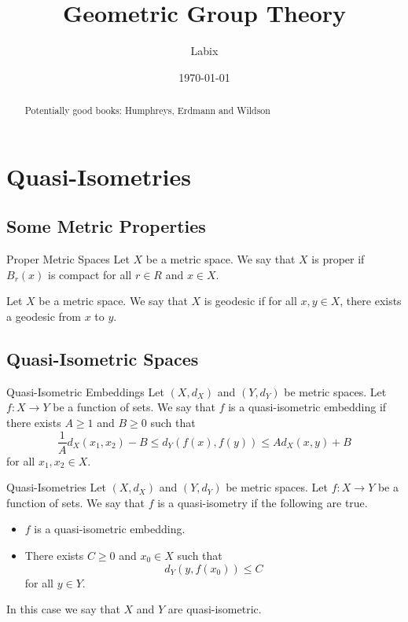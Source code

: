 \documentclass[a4paper]{article}
\title{Geometric Group Theory}
\author{Labix}
\date{\today}
\begin{document}
\maketitle
\begin{abstract}
Potentially good books: Humphreys, Erdmann and Wildson
\end{abstract}
\pagebreak
\tableofcontents

\pagebreak
\section{Quasi-Isometries}
\subsection{Some Metric Properties}
\begin{defn}{Proper Metric Spaces}{} Let $X$ be a metric space. We say that $X$ is proper if $B_r(x)$ is compact for all $r\in R$ and $x\in X$. 
\end{defn}

\begin{defn}{}{} Let $X$ be a metric space. We say that $X$ is geodesic if for all $x,y\in X$, there exists a geodesic from $x$ to $y$. 
\end{defn}

\subsection{Quasi-Isometric Spaces}
\begin{defn}{Quasi-Isometric Embeddings}{} Let $(X,d_X)$ and $(Y,d_Y)$ be metric spaces. Let $f:X\to Y$ be a function of sets. We say that $f$ is a quasi-isometric embedding if there exists $A\geq 1$ and $B\geq 0$ such that $$\frac{1}{A}d_X(x_1,x_2)-B\leq d_Y(f(x),f(y))\leq Ad_X(x,y)+B$$ for all $x_1,x_2\in X$. 
\end{defn}

\begin{defn}{Quasi-Isometries}{} Let $(X,d_X)$ and $(Y,d_Y)$ be metric spaces. Let $f:X\to Y$ be a function of sets. We say that $f$ is a quasi-isometry if the following are true. 
\begin{itemize}
\item $f$ is a quasi-isometric embedding. 
\item There exists $C\geq 0$ and $x_0\in X$ such that $$d_Y(y,f(x_0))\leq C$$ for all $y\in Y$. 
\end{itemize}
In this case we say that $X$ and $Y$ are quasi-isometric. 
\end{defn}
\end{document}
